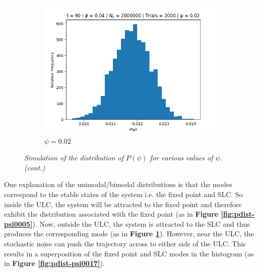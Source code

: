 \documentclass[letterpaper,12pt]{article}
\numberwithin{table}{section}
\numberwithin{figure}{section}
\numberwithin{equation}{section}
\newcommand{\ccaption}[1]{\caption{\textit{#1}}}
\newcommand{\reffig}[1]{\textbf{Figure \ref{#1}}}
\begin{document}
\begin{flushleft}
\begin{figure}[!h]
    \end{figure}
    \begin{figure}[!h]\ContinuedFloat

        \centering
    
        \begin{subfigure}{0.75\textwidth}
            \includegraphics[width=\linewidth]{img/pdist-psi002.jpg}
            \caption{$\psi = 0.02$}
            \label{fig:pdist-psi002}
        \end{subfigure}

        \captionsetup{width=\linewidth}
        \ccaption{Simulation of the distribution of $P(\psi)$ for various values of $\psi$. (cont.)}
        \label{fig:pdist}

    \end{figure}

    One explanation of the unimodal/bimodal distributions is that the modes correspond to the stable states of the system i.e. the fixed point and SLC. So inside the ULC, the system will be attracted to the fixed point and therefore exhibit the distribution associated with the fixed point (as in \reffig{fig:pdist-psi0005}). Now, outside the ULC, the system is attracted to the SLC and thus produces the corresponding mode (as in \reffig{fig:pdist-psi002}). However, near the ULC, the stochastic noise can push the trajectory across to either side of the ULC. This results in a superposition of the fixed point and SLC modes in the histogram (as in \reffig{fig:pdist-psi0017}).


\end{flushleft}
\end{document}
